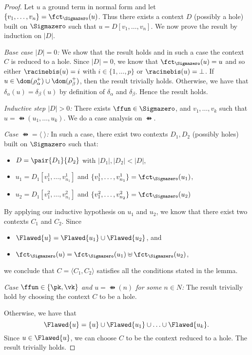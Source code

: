\begin{proof}
 Let $u$ a ground term in normal form and let $\{v_1, \ldots, v_n\} =
 \fct_{\Sigmazero}(u)$. Thus there exists a context $D$ (possibly a hole) built
 on $\Sigmazero$ such that $u = D[v_1, \ldots, v_n]$. We now prove the result by
 induction on $|D|$.

 \medskip

 \noindent \emph{Base case $|D| = 0$:} 
We show that the result holds and in such a case the context $C$ is
reduced to a hole.
Since $|D| = 0$, we know that $\fct_{\Sigmazero}(u) = u$ and so
 either $\racinebis(u) = i$ with $i \in \{1,\ldots,p\}$ or
 $\racinebis(u) = \bot$. 
If $u \in \dom(\rho^+_\alpha) \cup \dom(\rho^+_\beta)$, then the
result trivially holds. Otherwise, we have 
that $\delta_\alpha(u) = \delta_\beta(u)$ by definition of
$\delta_\alpha$ and $\delta_\beta$. Hence the result holds.


 \medskip

 \noindent \emph{Inductive step $|D| > 0$:} There exists $\ffun \in
 \Sigmazero$, and $v_1, \ldots, v_k$ such that $u = \ffun(u_1, \ldots,
 u_k)$. We do a case analysis on $\ffun$.

\smallskip{}

 \emph{Case $\ffun = \langle\;\rangle$:} In such a case, there exist
 two contexts $D_1,
 D_2$  (possibly holes) built on $\Sigmazero$ such that:
\begin{itemize}
\item  $D =
 \pair{D_1}{D_2}$ with $|D_1|, |D_2| < |D|$, 
\item $u_1 = D_1[v^1_1, \ldots, v^1_{n_1}]$ and $\{v^1_1, \ldots,
 v^1_{n_1}\} = \fct_{\Sigmazero}(u_1)$,
\item $u_2 = D_1[v^2_1, \ldots, v^2_{n_1}]$ and $\{v^2_1, \ldots,
 v^2_{n_2}\} = \fct_{\Sigmazero}(u_2)$
\end{itemize}
By applying our inductive hypothesis on $u_1$ and $u_2$, we know that
there exist two contexts $C_1$ and $C_2$.
Since 
\begin{itemize}
\item $\Flawed{u} =
   \Flawed{u_1} \cup \Flawed{u_2}$, and 
\item  $\fct_{\Sigmazero}(u) =
   \fct_{\Sigmazero}(u_1) \uplus \fct_{\Sigmazero}(u_2)$, 
\end{itemize}
we conclude
   that $C = \langle C_1,C_2 \rangle$ satisfies all the conditions
   stated in the lemma.
  

\smallskip{}

 \emph{Case $\ffun \in \{\pk, \vk\}$ and $u = \ffun(n)$ for some $n \in N$:}
 The result trivially hold by choosing the context $C$ to be a hole.

\smallskip{}

Otherwise, we have that 
\[
\Flawed{u} = \{u\} \cup \Flawed{u_1} \cup \ldots \cup 
\Flawed{u_k}.
\] 
Since $u \in \Flawed{u}$, we can choose $C$ to be the context reduced
to a hole. 
The result trivially holds.
\end{proof}




